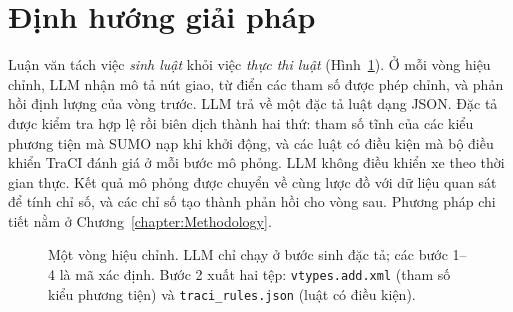 \documentclass[../DoAn.tex]{subfiles}
\begin{document}
\section{Định hướng giải pháp}
\label{section:1.3}

Luận văn tách việc \emph{sinh luật} khỏi việc \emph{thực thi luật} (Hình~\ref{fig:1.1}). Ở mỗi vòng hiệu chỉnh, LLM nhận mô tả nút giao, từ điển các tham số được phép chỉnh, và phản hồi định lượng của vòng trước. LLM trả về một đặc tả luật dạng JSON. Đặc tả được kiểm tra hợp lệ rồi biên dịch thành hai thứ: tham số tĩnh của các kiểu phương tiện mà SUMO nạp khi khởi động, và các luật có điều kiện mà bộ điều khiển TraCI đánh giá ở mỗi bước mô phỏng. LLM không điều khiển xe theo thời gian thực. Kết quả mô phỏng được chuyển về cùng lược đồ với dữ liệu quan sát để tính chỉ số, và các chỉ số tạo thành phản hồi cho vòng sau. Phương pháp chi tiết nằm ở Chương~\ref{chapter:Methodology}.

\begin{figure}[ht]
\centering
{}
\caption{Một vòng hiệu chỉnh. LLM chỉ chạy ở bước sinh đặc tả; các bước 1--4 là mã xác định. Bước 2 xuất hai tệp: \texttt{vtypes.add.xml} (tham số kiểu phương tiện) và \texttt{traci\_rules.json} (luật có điều kiện).}
\label{fig:1.1}
\end{figure}
\end{document}
